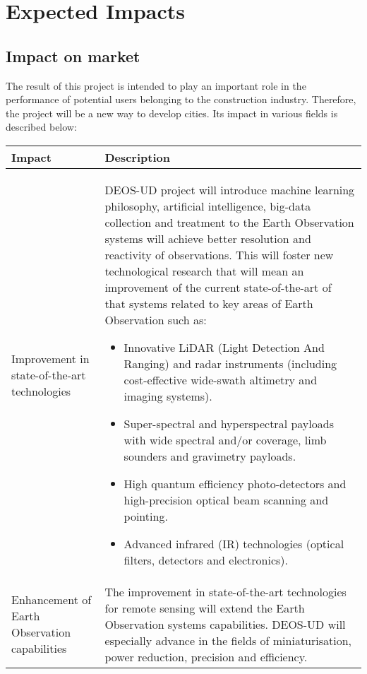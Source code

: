 \section{Expected Impacts}

\subsection{Impact on market}

The result of this project is intended to play an important role in the performance of potential users belonging to the construction industry. Therefore, the project will be a new way to develop cities. Its impact in various fields is described below:

\newpage
\begin{longtable}[H]{p{6cm} p{8cm}}
		
		\toprule[2pt]
		
		\textbf{Impact} &  \textbf{Description}\\
		
		\midrule [1.5pt]
		
		Improvement in state-of-the-art technologies & DEOS-UD project will introduce machine learning philosophy, artificial intelligence, big-data collection and treatment to the Earth Observation systems will achieve better resolution and reactivity of observations. This will foster new technological research that will mean an improvement of the current state-of-the-art of that systems related to key areas of Earth Observation such as: 
		\begin{itemize}  
			\item Innovative LiDAR (Light Detection And Ranging) and radar instruments (including cost-effective wide-swath altimetry and imaging systems).
			\item Super-spectral and hyperspectral payloads with wide spectral and/or coverage, limb sounders and gravimetry payloads.
			\item High quantum efficiency photo-detectors and high-precision optical beam scanning and pointing.
			\item Advanced infrared (IR) technologies (optical filters, detectors and electronics).
		\end{itemize}
	\vspace{0.2cm}\\
		
		\midrule
		
		Enhancement of Earth Observation capabilities & The improvement in state-of-the-art technologies for remote sensing will extend the Earth Observation systems capabilities. DEOS-UD will especially advance in the fields of miniaturisation, power reduction, precision and efficiency.\vspace{0.2cm}\\
		

\end{longtable}
